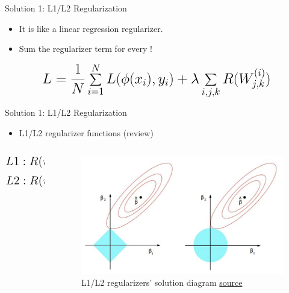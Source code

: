 \begin{frame}{Solution 1: L1/L2 Regularization}
    \begin{itemize}
        \item It is like a linear regression regularizer.
        \item Sum the regularizer term for every !
    \end{itemize}
    \vspace{0.2\textheight}
    \begin{equation*}
        \mathlarger{\mathlarger{\mathlarger{
        L = \frac{1}{N} \sum_{i=1}^{N} L(\phi(x_i), y_i) + \lambda \sum_{i,j,k} R(W_{j,k}^{(i)})
        }}}
    \end{equation*}
\end{frame}
\begin{frame}{Solution 1: L1/L2 Regularization}
    \begin{itemize}
        \item L1/L2 regularizer functions (review)
    \end{itemize}
	\begin{columns}
		\begin{column}[c]{0.5\textwidth}
			\centering
			\begin{equation*}
				\centering
				\mathlarger{\mathlarger{
							L1: R(w) = \vert w\vert
				}}
			\end{equation*}
			\begin{equation*}
				\centering
				\mathlarger{\mathlarger{
							L2: R(w) = w^2
				}}
			\end{equation*}
		\end{column}
		\begin{column}[c]{0.5\textwidth}
			\begin{figure}[H]
				\centering
				\includegraphics[width=\textwidth]{Figs/section_4/l1l2_reg.jpeg}
				\caption{L1/L2 regularizers' solution diagram \href{https://towardsdatascience.com/understanding-l1-and-l2-regularization-93918a5ac8d0}{source}}
			\end{figure}
		\end{column}
	\end{columns}
    

\end{frame}
